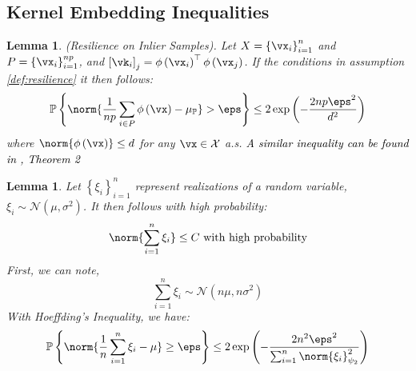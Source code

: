 \documentclass{article} %
\theoremstyle{plain}
\newtheorem{lemma}[thm]{Lemma}
\theoremstyle{definition}
\theoremstyle{remark}
\newcommand{\ccref}[1]{\textcolor{black}{\cref{#1}}}
\begin{document}
\clearpage




\clearpage

\tableofcontents
\clearpage

\begin{appendices}
	
	\clearpage
	\appendix
	\iffalse
	\begin{center}
		\huge{Appendix for Subquantile Minimization}
	\end{center}
	\startcontents[sections]
	\printcontents[sections]{l}{1}{\setcounter{tocdepth}{2}}
	\clearpage
	\fi
	\section{Kernel Embedding Inequalities}
	\begin{lemma}
		(Resilience on Inlier Samples). Let $X = \left\{\vx_i\right\}_{i=1}^n$ and $P = \left\{\vx_i\right\}_{i=1}^{np}$, and $\left[\vk_{i}\right]_j = \phi\left(\vx_i\right)^\top \phi\left(\vx_j\right)$. If the conditions in assumption \ccref{def:resilience} it then follows:
		\begin{equation*}
			\mathbb{P}\left\{\norm{\frac{1}{np}\sum_{i \in P}\phi\left(\vx\right) - \mu_\mathbb{P}} > \eps \right\} \leq 2\exp\left(-\frac{2np\eps^2}{d^2}\right)
		\end{equation*} where $\norm{\phi\left(\vx\right)} \leq d$ for any $ \vx \in \mathcal{X}$ a.s. \textcolor{black}{A similar inequality can be found in \citep{Schneider2016}, Theorem 2}
	\end{lemma}
	
	\begin{lemma}
		Let $\left\{\xi_i\right\}_{i=1}^n$ represent realizations of a random variable, $\xi_i \sim \mathcal{N}\left(\mu, \sigma^2\right)$. It then follows with high probability:
		\begin{equation}
			\norm{\sum_{i=1}^n \xi_i} \leq C \text{ with high probability}
		\end{equation}
		First, we can note,
		\begin{equation}
			\sum_{i=1}^n \xi_i \sim \mathcal{N}\left(n\mu, n \sigma^2\right)
		\end{equation}
		With Hoeffding's Inequality, we have:
		\begin{equation}
			\mathbb{P}\left\{\norm{\frac{1}{n}\sum_{i=1}^n \xi_i - \mu} \geq \eps\right\} \leq 2\exp\left(-\frac{2n^2\eps^2}{\sum_{i=1}^n\norm{\xi_i}_{\psi_2}^2}\right)
		\end{equation}
	\end{lemma}


\end{appendices}
\end{document}
